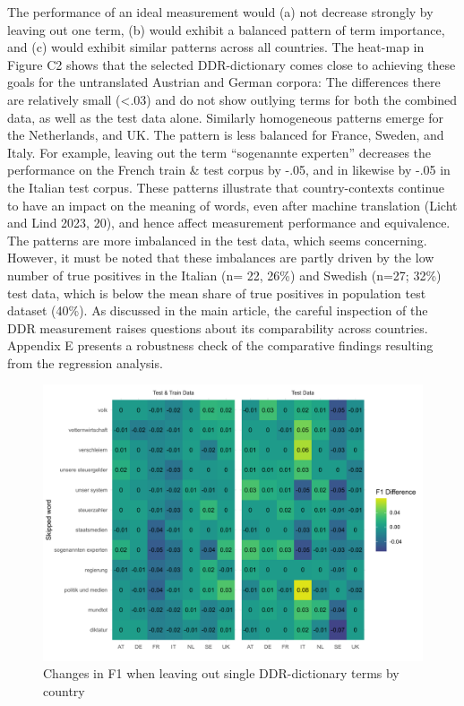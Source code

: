 \documentclass[
]{ccr}
\begin{document}
The performance of an ideal measurement would (a) not decrease strongly
by leaving out one term, (b) would exhibit a balanced pattern of term
importance, and (c) would exhibit similar patterns across all countries.
The heat-map in Figure C2 shows that the selected DDR-dictionary comes
close to achieving these goals for the untranslated Austrian and German
corpora: The differences there are relatively small
(\textless\textbar.03\textbar) and do not show outlying terms for both
the combined data, as well as the test data alone. Similarly homogeneous
patterns emerge for the Netherlands, and UK. The pattern is less
balanced for France, Sweden, and Italy. For example, leaving out the
term ``sogenannte experten'' decreases the performance on the French
train \& test corpus by -.05, and in likewise by -.05 in the Italian
test corpus. These patterns illustrate that country-contexts continue to
have an impact on the meaning of words, even after machine translation
(Licht and Lind 2023, 20), and hence affect measurement performance and
equivalence. The patterns are more imbalanced in the test data, which
seems concerning. However, it must be noted that these imbalances are
partly driven by the low number of true positives in the Italian (n= 22,
26\%) and Swedish (n=27; 32\%) test data, which is below the mean share
of true positives in population test dataset (40\%). As discussed in the
main article, the careful inspection of the DDR measurement raises
questions about its comparability across countries. Appendix E presents
a robustness check of the comparative findings resulting from the
regression analysis.

\begin{figure}

{\centering \includegraphics{plots/heatmap_skip_words_20231129.pdf}

}

\caption{Changes in F1 when leaving out single DDR-dictionary terms by
country}

\end{figure}
\end{document}
